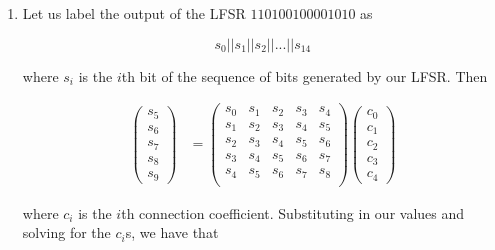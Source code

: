 \begin{enumerate}

\item Let us label the output of the LFSR $110100100001010$ as

\[s_0 || s_1 || s_2 || ... || s_{14} \]

where $s_i$ is the $i$th bit of the sequence of bits generated by our LFSR. Then

\begin{align*}
\begin{pmatrix}
s_5 \\ s_6 \\ s_7 \\ s_8 \\ s_9 
\end{pmatrix}
&= 
\begin{pmatrix}
s_0 & s_1 & s_2 & s_3 & s_4 \\
s_1 & s_2 & s_3 & s_4 & s_5 \\
s_2 & s_3 & s_4 & s_5 & s_6 \\
s_3 & s_4 & s_5 & s_6 & s_7 \\
s_4 & s_5 & s_6 & s_7 & s_8 \\
\end{pmatrix} 
\begin{pmatrix}
c_0 \\ c_1 \\ c_2 \\ c_3 \\ c_4
\end{pmatrix} 
\end{align*}

where $c_i$ is the $i$th connection coefficient. Substituting in our values and
solving for the $c_i$s, we have that


\end{enumerate}
